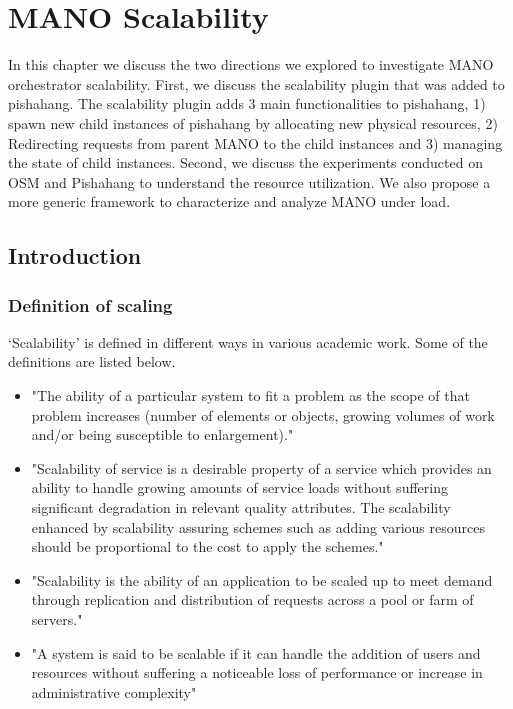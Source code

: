 \chapter{MANO Scalability}
\label{ch:Scalability}

In this chapter we discuss the two directions we explored to investigate MANO orchestrator scalability. First, we discuss the scalability plugin that was added to pishahang. The scalability plugin adds 3 main functionalities to pishahang, 1) spawn new child instances of pishahang by allocating new physical resources, 2) Redirecting requests from parent MANO to the child instances and 3) managing the state of child instances. Second, we discuss the experiments conducted on OSM and Pishahang to understand the resource utilization. We also propose a more generic framework to characterize and analyze MANO under load.

\section{Introduction}


\subsection{Definition of scaling}
`Scalability' is defined in different ways in various academic work. Some of the definitions are listed below.
\begin{itemize}	 
	
	\item "The ability of a particular system to fit a problem as the scope of that problem increases (number of elements or objects, growing volumes of work and/or being susceptible to enlargement)." \cite{furht_handbook_2010}
	
	\item "Scalability of service is a desirable property of a service which provides an ability to handle growing amounts of service loads without suffering significant degradation in relevant quality attributes. The scalability enhanced by scalability assuring schemes such as adding various resources should be proportional to the cost to apply the schemes." \cite{lee_software_2010}
	
	\item "Scalability is the ability of an application to be scaled up to meet demand through replication and distribution of requests across a pool or farm of servers." \cite{chieu_scalability_2011}
	
	\item "A system is said to be scalable if it can handle the addition of users and resources without suffering a noticeable loss of performance or increase in administrative complexity" \cite{noauthor_scale_nodate}
	
\end{itemize}

